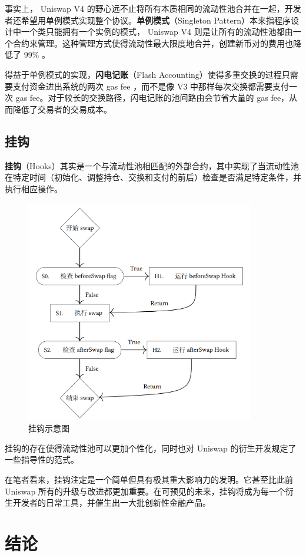 \documentclass[12pt, a4paper, oneside]{ctexart}
\begin{document}
事实上， Uniswap V4 的野心远不止将所有本质相同的流动性池合并在一起，开发者还希望用单例模式实现整个协议。\textbf{单例模式}（Singleton Pattern）本来指程序设计中一个类只能拥有一个实例的模式， Uniswap V4 则是让所有的流动性池都由一个合约来管理。这种管理方式使得流动性最大限度地合并，创建新币对的费用也降低了 99\% 。

得益于单例模式的实现，\textbf{闪电记账}（Flash Accounting）使得多重交换的过程只需要支付资金进出系统的两次 gas fee ，而不是像 V3 中那样每次交换都需要支付一次 gas fee。对于较长的交换路径，闪电记账的池间路由会节省大量的 gas fee，从而降低了交易者的交易成本。

\subsection{挂钩}

\textbf{挂钩}（Hooks）其实是一个与流动性池相匹配的外部合约，其中实现了当流动性池在特定时间（初始化、调整持仓、交换和支付的前后）检查是否满足特定条件，并执行相应操作。

\begin{figure}[htbp]
    \centering
    \includegraphics[width=10cm]{Hooks.png}
    \caption{挂钩示意图}
\end{figure}

挂钩的存在使得流动性池可以更加个性化，同时也对 Uniswap 的衍生开发规定了一些指导性的范式。

在笔者看来，挂钩注定是一个简单但具有极其重大影响力的发明。它甚至比此前 Uniswap 所有的升级与改进都更加重要。在可预见的未来，挂钩将成为每一个衍生开发者的日常工具，并催生出一大批创新性金融产品。

\section{结论}
\end{document}
